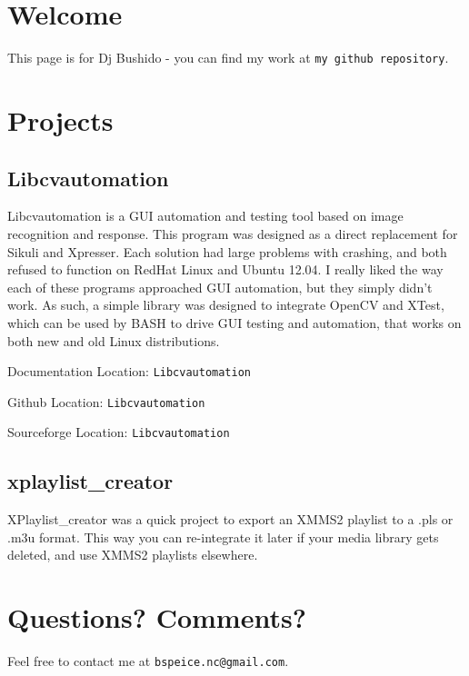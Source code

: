 \section{Welcome}\label{index_welcome}
This page is for Dj Bushido - you can find my work at {\tt my github repository}. \section{Projects}\label{index_projects}
\subsection{Libcvautomation}\label{index_libcvautomation}
Libcvautomation is a GUI automation and testing tool based on image recognition and response. This program was designed as a direct replacement for Sikuli and Xpresser. Each solution had large problems with crashing, and both refused to function on Red\-Hat Linux and Ubuntu 12.04. I really liked the way each of these programs approached GUI automation, but they simply didn't work. As such, a simple library was designed to integrate Open\-CV and XTest, which can be used by BASH to drive GUI testing and automation, that works on both new and old Linux distributions.

Documentation Location: {\tt Libcvautomation}

Github Location: {\tt Libcvautomation}

Sourceforge Location: {\tt Libcvautomation}\subsection{xplaylist\_\-creator}\label{index_xplaylistcreator}
XPlaylist\_\-creator was a quick project to export an XMMS2 playlist to a .pls or .m3u format. This way you can re-integrate it later if your media library gets deleted, and use XMMS2 playlists elsewhere.\section{Questions? Comments?}\label{index_questions}
Feel free to contact me at {\tt bspeice.nc@gmail.com}. 